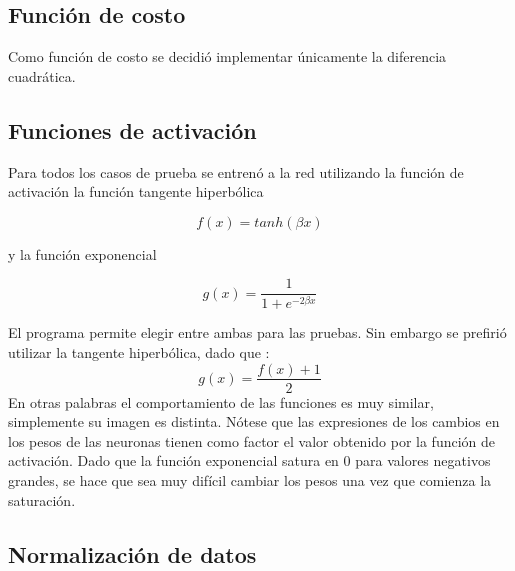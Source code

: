 \documentclass[%
    final,
    reprint,
    notitlepage,
    narroweqnarray,
    inline,
    twoside,
    invited
    ]{ieee}
\begin{document}
\subsection{Función de costo}

Como función de costo se decidió implementar únicamente la diferencia cuadrática.


\subsection{Funciones de activación}

\par Para todos los casos de prueba se entrenó a la red utilizando la función de activación la función tangente hiperbólica

\begin{equation}
f(x) = tanh(\beta x)
\end{equation}


y la función exponencial

\begin{equation}
g(x) = \frac{1}{1+e^{-2 \beta x}}
\end{equation}

El programa permite elegir entre ambas para las pruebas. Sin embargo se prefirió utilizar la tangente hiperbólica, dado que :
\begin{equation}
g(x) = \frac{f(x) + 1}{2}
\end{equation}
En otras palabras el comportamiento de las funciones es muy similar, simplemente su imagen es distinta. Nótese que las 
expresiones de los cambios en los pesos de las neuronas tienen como factor el valor  obtenido 
por la función de activación. Dado que la función exponencial satura en $0$ para valores negativos grandes, se 
hace que sea muy difícil cambiar los pesos una vez que comienza la saturación.

\subsection{Normalización de datos}
\end{document}
